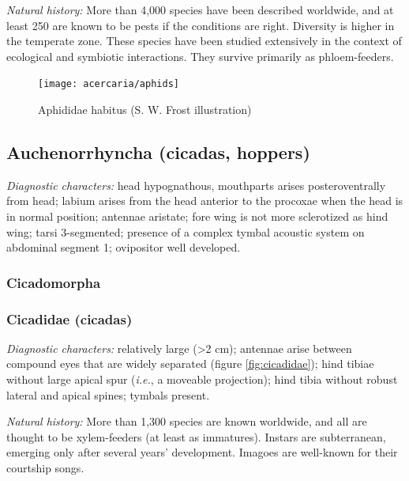 \noindent{}\textit{Natural history:} More than 4,000 species have been described worldwide, and at least 250 are known to be pests if the conditions are right. Diversity is higher in the temperate zone. These species have been studied extensively in the context of ecological and symbiotic interactions. They survive primarily as phloem-feeders.\vspace{3mm}

\begin{figure}[ht!]
 \centering
 \texttt{[image: acercaria/aphids]}
 \caption{Aphididae habitus (S. W. Frost illustration)}
 \label{fig:aphid1}
\end{figure}

\subsection{Auchenorrhyncha (cicadas, hoppers)}
\noindent{}\textit{Diagnostic characters:} head hypognathous, mouthparts arises posteroventrally from head; labium arises from the head anterior to the procoxae when the head is in normal position; antennae aristate; fore wing is not more sclerotized as hind wing; tarsi 3-segmented; presence of a complex tymbal acoustic system on abdominal segment 1; ovipositor well developed.\vspace{3mm}

\subsubsection*{Cicadomorpha}

\subsubsection{Cicadidae (cicadas)}
\noindent{}\textit{Diagnostic characters:} relatively large (\textgreater{}2 cm); antennae arise between compound eyes that are widely separated (figure \ref{fig:cicadidae}); hind tibiae without large apical spur (\textit{i.e.}, a moveable projection); hind tibia without robust lateral and apical spines; tymbals present.\vspace{3mm}

\noindent{}\textit{Natural history:} More than 1,300 species are known worldwide, and all are thought to be xylem-feeders (at least as immatures). Instars are subterranean, emerging only after several years' development. Imagoes are well-known for their courtship songs.\vspace{3mm}

